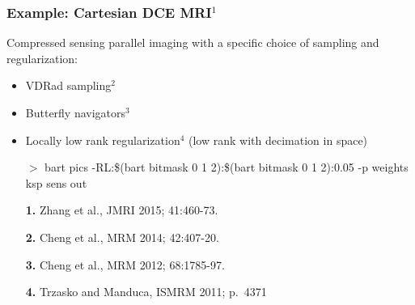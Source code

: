 \documentclass{beamer}
\begin{document}
\begin{frame}
\frametitle{Example: Cartesian DCE MRI$^1$}

Compressed sensing parallel imaging with a
specific choice of sampling and regularization:
\vspace{0.3cm}
\begin{itemize}
\item {VDRad sampling$^2$}
\item {\color{red}Butterfly navigators$^3$}
\item {\color{yellow}Locally low rank regularization$^4$} (low rank with decimation in {\color{blue}space})
\vspace{0.3cm}
\item[$>$] bart pics -R{\color{yellow}L}:{\color{blue}\$(bart bitmask 0 1 2)}:{\color{blue}\$(bart bitmask 0 1
  2)}:{\color{pink}0.05}  {\color{red}-p weights} ksp {\color{green}sens} out
\end{itemize}



\vfill
{\tiny
\begin{itemize}
\item[] {\bf 1.} Zhang et al., JMRI 2015; 41:460-73.
\item[] {\bf 2.} Cheng et al., MRM 2014; 42:407-20.
\item[] {\bf 3.} Cheng et al., MRM 2012; 68:1785-97.
\item[] {\bf 4.} Trzasko and Manduca,  ISMRM 2011; p.\ 4371
\end{itemize}
}

\end{frame}
\end{document}
